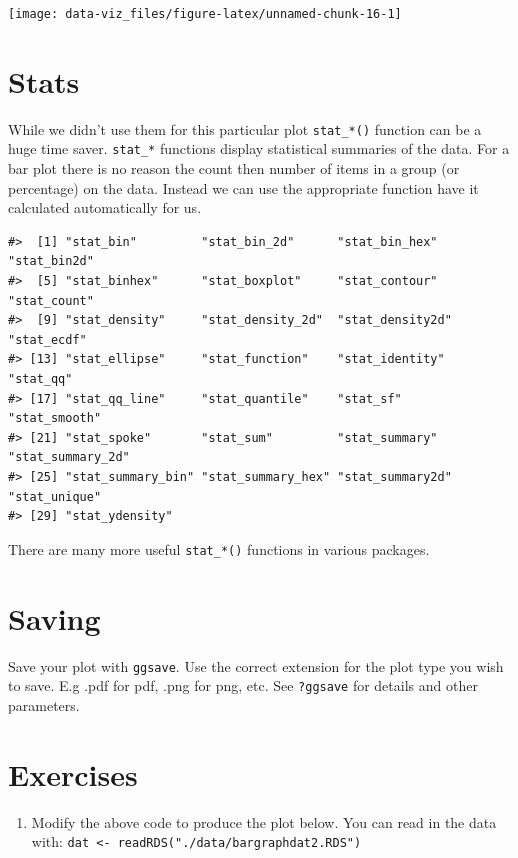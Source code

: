 \documentclass[]{book}
\providecommand{\tightlist}{%
  \setlength{\itemsep}{0pt}\setlength{\parskip}{0pt}}
\theoremstyle{definition}
\theoremstyle{definition}
\theoremstyle{definition}
\theoremstyle{remark}
\begin{document}
\begin{center}\texttt{[image: data-viz\_files/figure-latex/unnamed-chunk-16-1]} \end{center}

\section{Stats}\label{stats}

While we didn't use them for this particular plot \texttt{stat\_*()}
function can be a huge time saver. \texttt{stat\_*} functions display
statistical summaries of the data. For a bar plot there is no reason the
count then number of items in a group (or percentage) on the data.
Instead we can use the appropriate function have it calculated
automatically for us.

\begin{verbatim}
#>  [1] "stat_bin"         "stat_bin_2d"      "stat_bin_hex"     "stat_bin2d"      
#>  [5] "stat_binhex"      "stat_boxplot"     "stat_contour"     "stat_count"      
#>  [9] "stat_density"     "stat_density_2d"  "stat_density2d"   "stat_ecdf"       
#> [13] "stat_ellipse"     "stat_function"    "stat_identity"    "stat_qq"         
#> [17] "stat_qq_line"     "stat_quantile"    "stat_sf"          "stat_smooth"     
#> [21] "stat_spoke"       "stat_sum"         "stat_summary"     "stat_summary_2d" 
#> [25] "stat_summary_bin" "stat_summary_hex" "stat_summary2d"   "stat_unique"     
#> [29] "stat_ydensity"
\end{verbatim}

There are many more useful \texttt{stat\_*()} functions in various
packages.

\section{Saving}\label{saving}

Save your plot with \texttt{ggsave}. Use the correct extension for the
plot type you wish to save. E.g .pdf for pdf, .png for png, etc. See
\texttt{?ggsave} for details and other parameters.

\section{Exercises}\label{exercises-3}

\begin{enumerate}
\def\labelenumi{\arabic{enumi}.}
\tightlist
\item
  Modify the above code to produce the plot below. You can read in the
  data with:
  \texttt{dat\ \textless{}-\ readRDS("./data/bargraphdat2.RDS")}
\end{enumerate}
\end{document}
